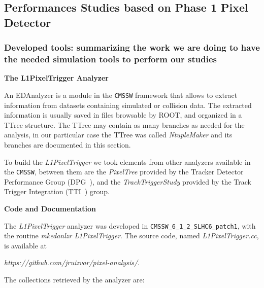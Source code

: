 \subsection{Performances Studies based on Phase 1 Pixel Detector}

\subsubsection{Developed tools: summarizing the work we are doing to have the needed simulation tools to perform our studies}

\vspace{0.5 cm}
\textbf{The L1PixelTrigger Analyzer}

An EDAnalyzer is a module in the \texttt{CMSSW} framework that allows to extract information from datasets
containing simulated or collision data. The extracted information is usually saved in files browsable by ROOT,
and organized in a TTree structure. The TTree may contain as many branches as needed for the analysis, in our particular case the TTree was called \textit{NtupleMaker}
and its branches are documented in this section.

To build the \textit{L1PixelTrigger} we took elements from other analyzers available in the \texttt{CMSSW}, between them are the
\textit{PixelTree} provided by the Tracker Detector Performance Group (DPG~\cite{ref:DPG}), and the \textit{TrackTriggerStudy}
provided by the Track Trigger Integration (TTI~\cite{ref:TTI}) group.

\vspace{0.5 cm}
\textbf{Code and Documentation}

The \textit{L1PixelTrigger} analyzer was developed in \texttt{CMSSW\_6\_1\_2\_SLHC6\_patch1}, with the routine
{\it mkedanlzr L1PixelTrigger}. The source code, named {\it L1PixelTrigger.cc}, is available at

{\it https://github.com/jruizvar/pixel-analysis/}. 

The collections retrieved by the analyzer are:

